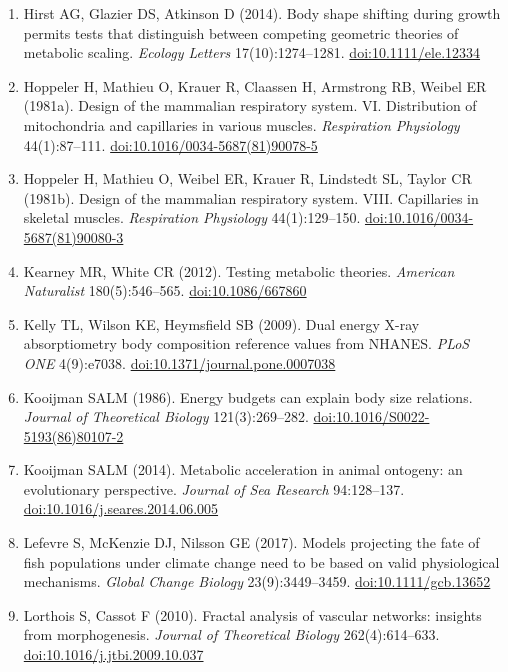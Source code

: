 \begin{small}
\begin{enumerate}[label={},leftmargin=1.2em,itemindent=-1.2em,itemsep=0.15em]
\item Hirst AG, Glazier DS, Atkinson D (2014). Body shape shifting during growth permits tests that distinguish between competing geometric theories of metabolic scaling. \emph{Ecology Letters} 17(10):1274–1281. \href{https://doi.org/10.1111/ele.12334}{doi:10.1111/ele.12334}
\item Hoppeler H, Mathieu O, Krauer R, Claassen H, Armstrong RB, Weibel ER (1981a). Design of the mammalian respiratory system. VI. Distribution of mitochondria and capillaries in various muscles. \emph{Respiration Physiology} 44(1):87–111. \href{https://doi.org/10.1016/0034-5687(81)90078-5}{doi:10.1016/0034-5687(81)90078-5}
\item Hoppeler H, Mathieu O, Weibel ER, Krauer R, Lindstedt SL, Taylor CR (1981b). Design of the mammalian respiratory system. VIII. Capillaries in skeletal muscles. \emph{Respiration Physiology} 44(1):129–150. \href{https://doi.org/10.1016/0034-5687(81)90080-3}{doi:10.1016/0034-5687(81)90080-3}
\item Kearney MR, White CR (2012). Testing metabolic theories. \emph{American Naturalist} 180(5):546–565. \href{https://doi.org/10.1086/667860}{doi:10.1086/667860}
\item Kelly TL, Wilson KE, Heymsfield SB (2009). Dual energy X-ray absorptiometry body composition reference values from NHANES. \emph{PLoS ONE} 4(9):e7038. \href{https://doi.org/10.1371/journal.pone.0007038}{doi:10.1371/journal.pone.0007038}
\item Kooijman SALM (1986). Energy budgets can explain body size relations. \emph{Journal of Theoretical Biology} 121(3):269–282. \href{https://doi.org/10.1016/S0022-5193(86)80107-2}{doi:10.1016/S0022-5193(86)80107-2}
\item Kooijman SALM (2014). Metabolic acceleration in animal ontogeny: an evolutionary perspective. \emph{Journal of Sea Research} 94:128–137. \href{https://doi.org/10.1016/j.seares.2014.06.005}{doi:10.1016/j.seares.2014.06.005}
\item Lefevre S, McKenzie DJ, Nilsson GE (2017). Models projecting the fate of fish populations under climate change need to be based on valid physiological mechanisms. \emph{Global Change Biology} 23(9):3449–3459. \href{https://doi.org/10.1111/gcb.13652}{doi:10.1111/gcb.13652}
\item Lorthois S, Cassot F (2010). Fractal analysis of vascular networks: insights from morphogenesis. \emph{Journal of Theoretical Biology} 262(4):614–633. \href{https://doi.org/10.1016/j.jtbi.2009.10.037}{doi:10.1016/j.jtbi.2009.10.037}

\end{enumerate}
\end{small}
